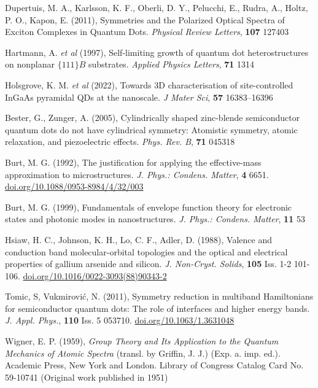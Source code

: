 \documentclass[12pt]{article}
\begin{document}
\begin{thebibliography}{10}
Dupertuis, M. A., Karlsson, K. F., Oberli, D. Y., Pelucchi, E., Rudra, A., Holtz, P. O., Kapon, E. (2011), Symmetries and the Polarized Optical Spectra of Exciton Complexes in Quantum Dots. \textit{Physical Review Letters}, \textbf{107} 127403

Hartmann, A. \textit{et al} (1997), Self-limiting growth of quantum dot heterostructures on nonplanar $\{111\}B$ substrates. \textit{Applied Physics Letters}, \textbf{71} 1314

Holsgrove, K. M. \textit{et al} (2022), Towards 3D characterisation of site-controlled InGaAs pyramidal QDs at the nanoscale. \textit{J Mater Sci}, \textbf{57} 16383--16396

Bester, G., Zunger, A. (2005), Cylindrically shaped zinc-blende semiconductor quantum dots do not have cylindrical symmetry: Atomistic symmetry, atomic relaxation, and piezoelectric effects. \textit{Phys. Rev. B}, \textbf{71} 045318

Burt, M. G. (1992), The justification for applying the effective-mass approximation to microstructures. \textit{J. Phys.: Condens. Matter}, \textbf{4} 6651. \href{https://doi.org/10.1088/0953-8984/4/32/003}{doi.org/10.1088/0953-8984/4/32/003}

Burt, M. G. (1999), Fundamentals of envelope function theory for electronic states and photonic modes in nanostructures. \textit{J. Phys.: Condens. Matter}, \textbf{11} 53

Hsiaw, H. C., Johnson, K. H., Lo, C. F., Adler, D. (1988), Valence and conduction band molecular-orbital topologies and the optical and electrical properties of gallium arsenide and silicon. \textit{J. Non-Cryst. Solids}, \textbf{105} Iss. 1-2 101-106. \href{https://doi.org/10.1016/0022-3093(88)90343-2}{doi.org/10.1016/0022-3093(88)90343-2}

Tomic, S, Vukmirović, N. (2011), Symmetry reduction in multiband Hamiltonians for semiconductor quantum dots: The role of interfaces and higher energy bands. \textit{J. Appl. Phys.}, \textbf{110} Iss. 5 053710. \href{https://doi.org/10.1063/1.3631048}{doi.org/10.1063/1.3631048}

Wigner, E. P. (1959), \textit{Group Theory and Its Application to the Quantum Mechanics of Atomic Spectra} (transl. by Griffin, J. J.) (Exp. a. imp. ed.). Academic Press, New York and London. Library of Congress Catalog Card No. 59-10741 (Original work published in 1951)


\end{thebibliography}
\end{document}
